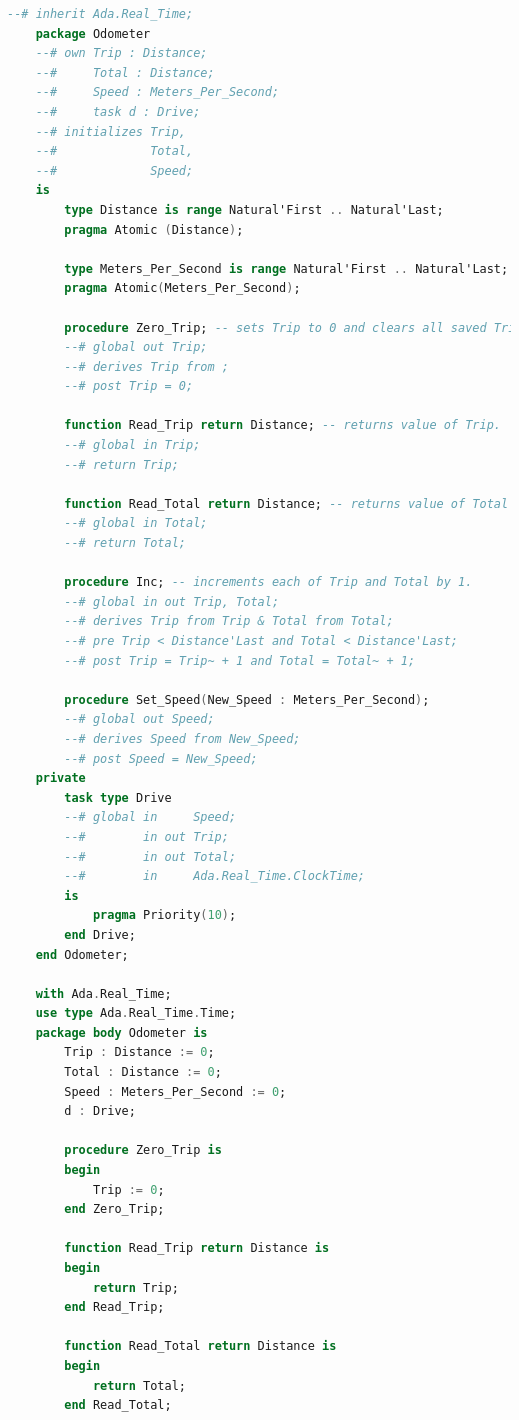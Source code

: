 \begin{lstlisting}[language=ada, frame=single, gobble=0, caption={Multitasking Odometer}, label={listing:Odometer2005Tasking}]
	--# inherit Ada.Real_Time;
	package Odometer
	--# own Trip : Distance;
	--#     Total : Distance;
	--#     Speed : Meters_Per_Second;
	--#     task d : Drive;
	--# initializes Trip, 
	--#             Total,
	--#             Speed;
	is
	    type Distance is range Natural'First .. Natural'Last;
	    pragma Atomic (Distance);
	    
	    type Meters_Per_Second is range Natural'First .. Natural'Last;
	    pragma Atomic(Meters_Per_Second);
	    
	    procedure Zero_Trip; -- sets Trip to 0 and clears all saved Trip marks.
	    --# global out Trip;
	    --# derives Trip from ;
	    --# post Trip = 0;
	    
	    function Read_Trip return Distance; -- returns value of Trip.
	    --# global in Trip;
	    --# return Trip;
	    
	    function Read_Total return Distance; -- returns value of Total
	    --# global in Total;
	    --# return Total;
	    
	    procedure Inc; -- increments each of Trip and Total by 1.
	    --# global in out Trip, Total;
	    --# derives Trip from Trip & Total from Total;
	    --# pre Trip < Distance'Last and Total < Distance'Last;
	    --# post Trip = Trip~ + 1 and Total = Total~ + 1;

	    procedure Set_Speed(New_Speed : Meters_Per_Second);
	    --# global out Speed;
	    --# derives Speed from New_Speed;
	    --# post Speed = New_Speed;                             
	private    	    
	    task type Drive
	    --# global in     Speed;
	    --#        in out Trip;
	    --#        in out Total;
	    --#        in     Ada.Real_Time.ClockTime;
	    is
	        pragma Priority(10);
	    end Drive;	    
	end Odometer;

	with Ada.Real_Time;
	use type Ada.Real_Time.Time;
	package body Odometer is
	    Trip : Distance := 0;
	    Total : Distance := 0;
	    Speed : Meters_Per_Second := 0;
	    d : Drive;
	    
	    procedure Zero_Trip is
	    begin
	        Trip := 0;
	    end Zero_Trip;
	    
	    function Read_Trip return Distance is
	    begin
	        return Trip;
	    end Read_Trip;
	    
	    function Read_Total return Distance is
	    begin
	        return Total;
	    end Read_Total;
	    

\end{lstlisting}
